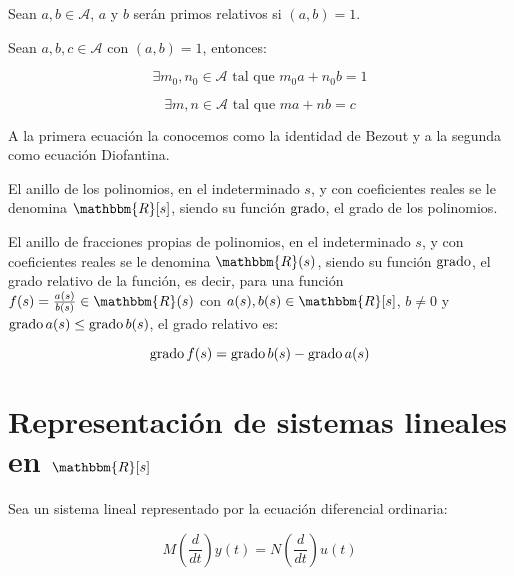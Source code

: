         \begin{definicion}
            Sean $a, b \in \mathcal{A}$, $a$ y $b$ serán primos relativos si $(a, b) = 1$.
        \end{definicion}

        \begin{lema}
            Sean $a, b, c \in \mathcal{A}$ con $(a, b) = 1$, entonces:

            \begin{equation}
                \exists m_0, n_0 \in \mathcal{A} \text{ tal que } m_0 a + n_0 b = 1
            \end{equation}

            \begin{equation}  \label{eq:anillos0}
                \exists m, n \in \mathcal{A} \text{ tal que } m a + n b = c
            \end{equation}

            A la primera ecuación la conocemos como la identidad de Bezout y a la segunda como ecuación Diofantina.
        \end{lema}

        \begin{definicion}
            El anillo de los polinomios, en el indeterminado $s$, y con coeficientes reales se le denomina $\mathbbm{R}[s]$, siendo su función $\operatorname{grado}$, el grado de los polinomios.

            El anillo de fracciones propias de polinomios, en el indeterminado $s$, y con coeficientes reales se le denomina $\mathbbm{R}(s)$, siendo su función $\operatorname{grado}$, el grado relativo de la función, es decir, para una función $f(s) = \frac{a(s)}{b(s)} \in \mathbbm{R}(s)$ con $a(s), b(s) \in \mathbbm{R}[s]$, $b \ne 0$ y $\operatorname{grado}{a(s)} \le \operatorname{grado}{b(s)}$, el grado relativo es:

            \begin{equation*}
                \operatorname{grado}{f(s)} = \operatorname{grado}{b(s)} - \operatorname{grado}{a(s)}
            \end{equation*}
        \end{definicion}

    \section{Representación de sistemas lineales en $\mathbbm{R}[s]$}

        Sea un sistema lineal representado por la ecuación diferencial ordinaria:

        \begin{equation} \label{eq:anillos1}
            M \left( \frac{d}{dt} \right) y(t) = N \left( \frac{d}{dt} \right) u(t)
        \end{equation}


